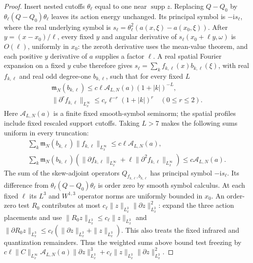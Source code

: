 \documentclass[11pt,a4paper]{article}
\numberwithin{equation}{section}
\newcommand{\supp}{\operatorname{supp}}
\newcommand{\ii}{\mathrm{i}}
\theoremstyle{definition}
\begin{document}
\begin{proof}
Insert nested cutoffs $\theta_\ell$ equal to one near $\supp z$.
Replacing $Q-Q_0$ by $\theta_\ell(Q-Q_0)\theta_\ell$ leaves its action
energy unchanged. Its principal symbol is $-\ii s_\ell$, where the
real underlying symbol is
$s_\ell=\theta_\ell^2(a(x,\xi)-a(x_0,\xi))$.
After $y=(x-x_0)/\ell$, every fixed $y$ and angular derivative of
$s_\ell(x_0+\ell y,\omega)$ is $O(\ell)$, uniformly in $x_0$:
the zeroth derivative uses the mean-value theorem, and each positive
$y$ derivative of $a$ supplies a factor $\ell$.
A real spatial Fourier expansion on a fixed $y$ cube therefore gives
$s_\ell=\sum_k f_{k,\ell}(x)b_{k,\ell}(\xi)$, with real $f_{k,\ell}$
and real odd degree-one $b_{k,\ell}$, such that for every fixed $L$
\begin{equation*}
\begin{gathered}
\mathfrak m_N(b_{k,\ell})\leq c\ell\mathcal A_{L,N}(a)(1+|k|)^{-L},\\
\|\partial^rf_{k,\ell}\|_{L^\infty_x}\leq c_r\ell^{-r}(1+|k|)^r
\quad(0\leq r\leq2).
\end{gathered}
\end{equation*}
Here $\mathcal A_{L,N}(a)$ is a finite fixed smooth-symbol seminorm;
the spatial profiles include fixed rescaled support cutoffs.
Taking $L>7$ makes the following sums uniform in every truncation:
\begin{equation*}
\begin{gathered}
\sum_k\mathfrak m_N(b_{k,\ell})\|f_{k,\ell}\|_{L^\infty_x}
\leq c\ell\mathcal A_{L,N}(a),\\
\sum_k\mathfrak m_N(b_{k,\ell})
 (\|\partial f_{k,\ell}\|_{L^\infty_x}+\ell\|\partial^2f_{k,\ell}\|_{L^\infty_x})
 \leq c\mathcal A_{L,N}(a).
\end{gathered}
\end{equation*}
The sum of the skew-adjoint operators $Q_{f_{k,\ell},b_{k,\ell}}$
has principal symbol $-\ii s_\ell$. Its difference from
$\theta_\ell(Q-Q_0)\theta_\ell$ is order zero by smooth symbol
calculus. At each fixed $\ell$ its $L^3$ and $W^{1,3}$ operator norms
are uniformly bounded in $x_0$. An order-zero test $R_0$ contributes
at most $c_\ell \|z\|_{L^3_x}\|\partial z\|_{L^3_x}^2$: expand the three action placements and use
$\|R_0z\|_{L^3_x}\leq c_\ell \|z\|_{L^3_x}$ and
$\|\partial R_0z\|_{L^3_x}\leq c_\ell(\|\partial z\|_{L^3_x}+\|z\|_{L^3_x})$. This also treats the fixed infrared
and quantization remainders. Thus the weighted sums above bound
test freezing by $c\ell\|C\|_{L^{\infty}_x}\mathcal A_{L,N}(a)\|\partial z\|_{L^3_x}^3+c_\ell \|z\|_{L^3_x}\|\partial z\|_{L^3_x}^2$.


\end{proof}
\end{document}
